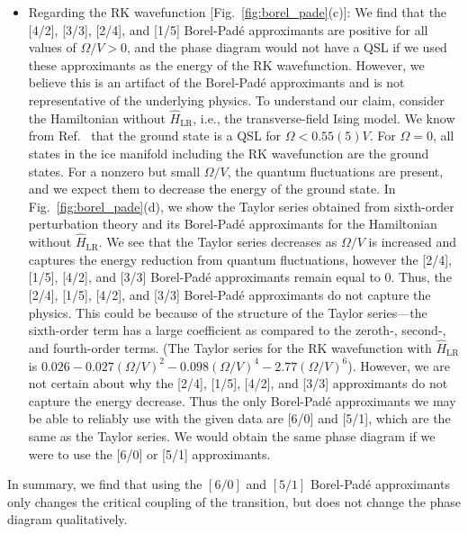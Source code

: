 \documentclass[twocolumn,superscriptaddress,amsmath,amssymb,aps,prx,nofootinbib]{revtex4-2}
\begin{document}
\begin{itemize}
    \item Regarding the RK wavefunction [Fig.~\ref{fig:borel_pade}(c)]: We find that the [4/2], [3/3], [2/4], and [1/5] Borel-Pad\'e approximants are positive for all values of $\Omega/V > 0$, and the phase diagram would not have a QSL if we used these approximants as the energy of the RK wavefunction. 
    However, we believe this is an artifact of the Borel-Pad\'e approximants and is not representative of the underlying physics. To understand our claim, consider the Hamiltonian without $\hat{H}_{\text{LR}}$, i.e., the transverse-field Ising model. We know from Ref.~\cite{emonts2018monte} that the ground state is a QSL for $\Omega < 0.55(5) V$. For $\Omega =0$, all states in the ice manifold including the RK wavefunction are the ground states. 
    For a nonzero but small $\Omega/V$, the quantum fluctuations are present, and we expect them to decrease the energy of the ground state. In 
    Fig.~\ref{fig:borel_pade}(d), we show the Taylor series obtained from sixth-order perturbation theory and its Borel-Pad\'e approximants for the Hamiltonian without $\hat{H}_{\text{LR}}$. 
    We see that the Taylor series decreases as $\Omega/V$ is increased and captures the energy reduction from quantum fluctuations, however the [2/4], [1/5], [4/2], and [3/3] Borel-Pad\'e approximants remain equal to 0.
    Thus, the [2/4], [1/5], [4/2], and [3/3] Borel-Pad\'e approximants do not capture the physics. This could be because of the structure of the Taylor series---the sixth-order term has a large coefficient as compared to the zeroth-, second-, and fourth-order terms. (The Taylor series for the RK wavefunction with $\hat{H}_{\text{LR}}$ is $0.026 - 0.027 (\Omega/V)^2 - 0.098 (\Omega/V)^4 - 2.77 (\Omega/V)^6$). However, we are not certain about why the [2/4], [1/5], [4/2], and [3/3] approximants do not capture the energy decrease.
    Thus the only Borel-Pad\'e approximants we may be able to reliably use with the given data are [6/0] and [5/1], which are the same as the Taylor series. We would obtain the same phase diagram if we were to use the [6/0] or [5/1] approximants.
\end{itemize}
In summary, we find that using the $[6/0]$ and $[5/1]$ Borel-Pad\'e approximants only changes the critical coupling of the transition, but does not change the phase diagram qualitatively.
\end{document}
